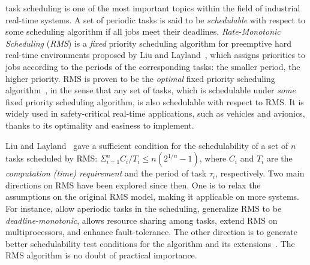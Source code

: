 \documentclass[10pt,journal]{IEEEtran}
\begin{document}
% 
% 
% 
% 
 task scheduling is one of the most important
topics within the field of industrial real-time systems.
A set of periodic tasks is said to be \emph{schedulable} with respect
to some scheduling algorithm if all jobs meet their
deadlines. \emph{Rate-Monotonic Scheduling} (\emph{RMS}) is a
\emph{fixed} priority scheduling algorithm for preemptive hard
real-time environments proposed by Liu and
Layland~\cite{DBLP:journals/jacm/LiuL73}, which assigns priorities to
jobs according to the periods of the corresponding tasks: the smaller
period, the higher priority. RMS is proven to be the \emph{optimal}
fixed priority scheduling algorithm~\cite{DBLP:journals/jacm/LiuL73},
in the sense that any set of tasks, which is schedulable under
\emph{some} fixed priority scheduling algorithm, is also schedulable
with respect to RMS. It is widely used in safety-critical real-time
applications, such as vehicles and avionics, thanks to its optimality
and easiness to implement.

Liu and Layland~\cite{DBLP:journals/jacm/LiuL73} gave a sufficient
condition for the schedulability of a set of $n$ tasks scheduled by
RMS: $\displaystyle\Sigma^n_{i=1}C_i/T_i \le n(2^{1/n}-1)$, where
$C_i$ and $T_i$ are the \emph{computation (time) requirement} and the
period of task $\tau_i$, respectively. Two main directions on RMS have
been explored since then. One is to relax the assumptions on the
original RMS model, making it applicable on more systems.  For
instance,
\cite{DBLP:conf/rtss/LehoczkySS87,DBLP:journals/rts/SpruntSL89,DBLP:conf/rtss/LehoczkyR92,DBLP:journals/tc/StrosniderLS95}
allow aperiodic tasks in the scheduling,
\cite{DBLP:journals/pe/LeungW82,audsley1993deadline} generalize RMS to
be \emph{deadline-monotonic}, \cite{DBLP:journals/tc/ShaRL90} allows
resource sharing among tasks,
\cite{dhall1978real,DBLP:journals/rts/LopezGDG03,DBLP:journals/tpds/LopezDG04,DBLP:journals/tc/BaruahG03}
extend RMS on multiprocessors, and
\cite{DBLP:journals/rts/OhS94,DBLP:journals/rts/GhoshMMS98,DBLP:journals/tpds/BertossiMR99}
enhance fault-tolerance. The other direction is to generate better
schedulability test conditions for the algorithm and its
extensions~\cite{DBLP:conf/rtss/LehoczkySD89,DBLP:conf/rtss/KuoM91,DBLP:journals/tc/BiniBB03,DBLP:journals/rts/LopezGDG03,DBLP:journals/tc/BaruahG03,gardner1999}. The
RMS algorithm is no doubt of practical importance.
\end{document}
